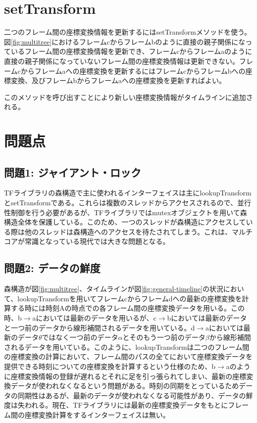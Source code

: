 \documentclass[a4paper]{jreport}	%
\begin{document}
\section{setTransform}
二つのフレーム間の座標変換情報を更新するにはsetTransformメソッドを使う。図\ref{fig:multitree}におけるフレームcからフレームbのように直接の親子関係になっているフレーム間の座標変換情報を更新でき、フレームcからフレームaのように直接の親子関係になっていないフレーム間の座標変換情報は更新できない。フレームcからフレームaへの座標変換を更新するにはフレームcからフレームbへの座標変換、及びフレームbからフレームaへの座標変換を更新すればよい。

このメソッドを呼び出すことにより新しい座標変換情報がタイムラインに追加される。


\section{問題点}
\subsection*{問題1: ジャイアント・ロック}
TFライブラリの森構造で主に使われるインターフェイスは主にlookupTransformとsetTransformである。これらは複数のスレッドからアクセスされるので、並行性制御を行う必要があるが、TFライブラリではmutexオブジェクトを用いて森構造全体を保護している。このため、一つのスレッドが森構造にアクセスしている際は他のスレッドは森構造へのアクセスを待たされてしまう。これは、マルチコアが常識となっている現代では大きな問題となる。

\subsection*{問題2: データの鮮度}
森構造が図\ref{fig:multitree}、タイムラインが図\ref{fig:general-timeline}の状況において、lookupTransformを用いてフレームcからフレームdへの最新の座標変換を計算する時には時刻Aの時点での各フレーム間の座標変換データを用いる。この時、b$\rightarrow$aにおいては最新のデータを用いるが、c$\rightarrow$bにおいては最新のデータと一つ前のデータから線形補間されるデータを用いている。d$\rightarrow$aにおいては最新のデータ$\theta$ではなく一つ前のデータ$\alpha$とそのもう一つ前のデータ$\beta$から線形補間されるデータを用いている。このように、lookupTransformは二つのフレーム間の座標変換の計算において、フレーム間のパスの全てにおいて座標変換データを提供できる時刻についての座標変換を計算するという仕様のため、b$\rightarrow$aのように座標変換情報の登録が遅れるとそれに足を引っ張られてしまい、最新の座標変換データが使われなくなるという問題がある。時刻の同期をとっているためデータの同期性はあるが、最新のデータが使われなくなる可能性があり、データの鮮度は失われる。現在、TFライブラリには最新の座標変換データをもとにフレーム間の座標変換計算をするインターフェイスは無い。
\end{document}
